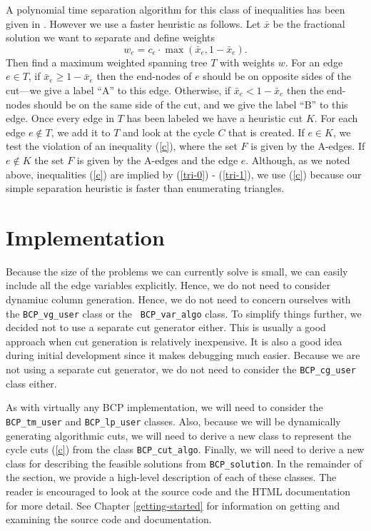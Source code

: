 A polynomial time separation algorithm for this class of inequalities
has been given in \cite{A:barahona-mahjoub:cut-polytope}. 
However we use a faster heuristic as
follows. Let $\bar{x}$ be the fractional solution we want to separate
and define weights
\begin{equation}
w_e = c_e \cdot \max(\bar{x}_e, 1-\bar{x}_e).
\end{equation}
Then find a maximum weighted spanning tree $T$ with weights $w$. For
an edge $e \in T$, if $\bar{x}_e \ge 1-\bar{x}_e$ then the end-nodes
of $e$ should be on opposite sides of the cut---we give a label ``A''
to this edge. Otherwise, if $ \bar{x}_e < 1-\bar{x}_e$ then the
end-nodes should be on the same side of the cut, and we give the label
``B'' to this edge. Once every edge in $T$ has been labeled we have a
heuristic cut $K$. For each edge $e \notin T$, we add it to $T$ and
look at the cycle $C$ that is created. If $e \in K$, we test the
violation of an inequality (\ref{c}), where the set $F$ is given by
the A-edges. If $e \notin K$ the set $F$ is given by the A-edges and
the edge $e$. Although, as we noted above, inequalities (\ref{c}) are
implied by (\ref{tri-0}) - (\ref{tri-1}), we use (\ref{c}) because our
simple separation heuristic is faster than enumerating triangles.

\section{Implementation}

Because the size of the problems we can currently solve is small, we
can easily include all the edge variables explicitly. Hence, we do not
need to consider dynamiuc column generation. Hence, we do not need to
concern ourselves with the {\tt BCP\_vg\_user} class or the {\tt
BCP\_var\_algo} class. To simplify things further, we decided not to
use a separate cut generator either. This is usually a good approach
when cut generation is relatively inexpensive. It is also a good idea
during initial development since it makes debugging much easier.
Because we are not using a separate cut generator, we do not need to
consider the {\tt BCP\_cg\_user} class either.

As with virtually any BCP implementation, we will need to consider the
{\tt BCP\_tm\_user} and {\tt BCP\_lp\_user} classes. Also, because we
will be dynamically generating algorithmic cuts, we will need to
derive a new class to represent the cycle cuts (\ref{c}) from the
class {\tt BCP\_cut\_algo}. Finally, we will need to derive a new
class for describing the feasible solutions from {\tt BCP\_solution}.
In the remainder of the section, we provide a high-level description
of each of these classes. The reader is encouraged to look at the
source code and the HTML documentation for more detail. See Chapter
\ref{getting-started} for information on getting and examining the
source code and documentation.

